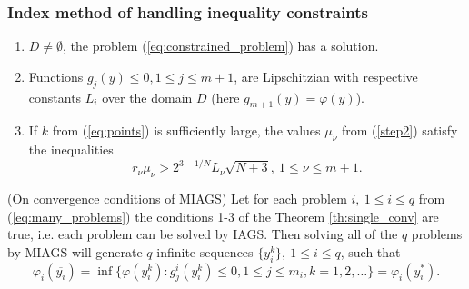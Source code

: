 \documentclass[aspectratio=1610]{beamer}
\begin{document}
\begin{frame}
  \frametitle{Index method of handling inequality constraints}
  \begin{enumerate}
    \item \(D\ne\emptyset\), the problem (\ref{eq:constrained_problem}) has a solution.
    \item Functions \(g_j(y)\leqslant 0, 1\leqslant j\leqslant m + 1\), are Lipschitzian with
respective constants \(L_i\) over the domain \(D\) (here \(g_{m+1}(y)=\varphi(y)\)).
    \item If \(k\) from (\ref{eq:points}) is sufficiently large,
    the values \(\mu_\nu\) from (\ref{step2}) satisfy the inequalities
    \begin{equation}
      r_\nu\mu_\nu > 2^{3-1/N}L_\nu \sqrt{N+3},\: 1\leqslant \nu \leqslant m + 1.
    \end{equation}
  \end{enumerate}
  \begin{theorem} (On convergence conditions of MIAGS) Let for each problem \(i,\:1\leqslant i\leqslant q\) from (\ref{eq:many_problems})
    the conditions 1-3 of the Theorem \ref{th:single_conv} are true, i.e. each problem can be solved by IAGS.
    Then solving all of the \(q\) problems by MIAGS will
    generate \(q\) infinite sequences \(\{y^k_i\},\:1\leqslant i\leqslant q\), such that
    \begin{displaymath}
      \varphi_i(\overline{y_i})=\inf\{ \varphi(y^k_i): g^i_j(y^k_i)\leqslant 0,1\leqslant j\leqslant m_i, k=1,2,\dots\}=\varphi_i(y^*_i).
    \end{displaymath}
  \end{theorem}
\end{frame}
\end{document}
